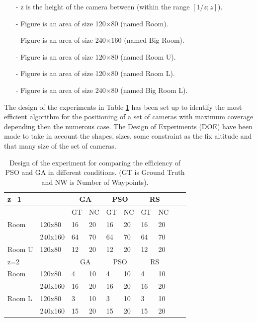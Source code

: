 \begin{itemize}
\item[-]    z is the height of the camera between (within the range $[1/z;z]$).
\item[-]	Figure  is an area of size 120$\times$80 (named Room). 
\item[-]	Figure  is an area of size 240$\times$160 (named Big Room).
\item[-]	Figure  is an area of size 120$\times$80 (named Room U).
\item[-]	Figure  is an area of size 120$\times$80 (named Room L).
\item[-]	Figure  is an area of size 240$\times$80 (named Big Room L).
\end{itemize}


The design of the experiments in Table \ref{table:table1} has been set up to identify the most efficient algorithm for the positioning of a set of cameras with maximum coverage depending then the numerous case. 
The Design of Experiments (DOE) have been made to take in account the  shapes, sizes, some constraint as the fix altitude and that many size of the set of cameras.


\begin{table} [!htb]
\begin{tabular}{|l|l|l|l|l|l|l|l|l|l|}
  \hline
  \multicolumn{2}{|l|}{z=1 } &\multicolumn{2}{|c|}{GA}  & \multicolumn{2}{|c|}{PSO} & \multicolumn{2}{|c|}{RS}  \\  \hline
  \multicolumn{2}{|c|}{ } & GT & NC & GT & NC & GT & NC\\ \hline
  Room &  120x80 & 16 &20 & 16 & 20 & 16 & 20\\ \cline{2-8}
     &  240x160 & 64 &70 & 64 & 70 & 64 & 70 \\ \hline
  Room U &  120x80 & 12 &20 & 12 & 20 & 12 & 20\\ \hline
  \multicolumn{2}{|l|}{z=2 } &\multicolumn{2}{|c|}{GA}  & \multicolumn{2}{|c|}{PSO}& \multicolumn{2}{|c|}{RS}  \\  \hline
 Room &  120x80 & 4 &10 & 4 & 10 & 4 & 10\\ \cline{2-8}
     &  240x160 & 16 &20 & 16 & 20 & 16 & 20 \\ \hline
 Room L&  120x80 & 3 &10 & 3 & 10 & 3 & 10\\ \cline{2-8}
     &  240x160 & 15 &20 & 15 & 20 & 15 & 20 \\ \hline
  
\end{tabular}
\caption{Design of the experiment for comparing the efficiency of PSO and GA in different conditions.  (GT is Ground Truth and NW is Number of Waypoints).}\label{table:table1}

\end{table}

